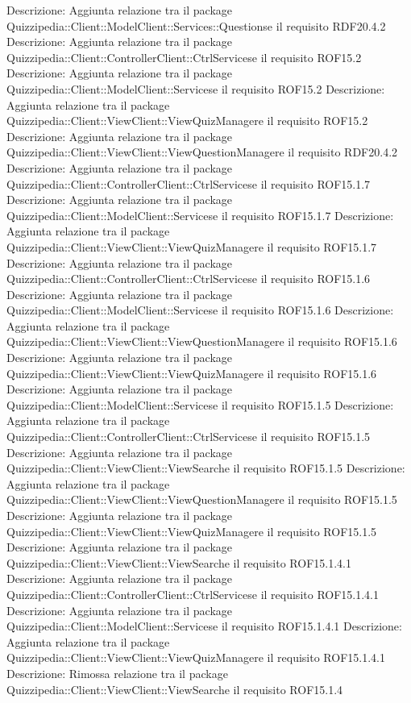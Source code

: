 Descrizione: Aggiunta relazione tra il package Quizzipedia::Client::ModelClient::Services::Questionse il requisito RDF20.4.2 
Descrizione: Aggiunta relazione tra il package Quizzipedia::Client::ControllerClient::CtrlServicese il requisito ROF15.2 
Descrizione: Aggiunta relazione tra il package Quizzipedia::Client::ModelClient::Servicese il requisito ROF15.2 
Descrizione: Aggiunta relazione tra il package Quizzipedia::Client::ViewClient::ViewQuizManagere il requisito ROF15.2 
Descrizione: Aggiunta relazione tra il package Quizzipedia::Client::ViewClient::ViewQuestionManagere il requisito RDF20.4.2 
Descrizione: Aggiunta relazione tra il package Quizzipedia::Client::ControllerClient::CtrlServicese il requisito ROF15.1.7 
Descrizione: Aggiunta relazione tra il package Quizzipedia::Client::ModelClient::Servicese il requisito ROF15.1.7 
Descrizione: Aggiunta relazione tra il package Quizzipedia::Client::ViewClient::ViewQuizManagere il requisito ROF15.1.7 
Descrizione: Aggiunta relazione tra il package Quizzipedia::Client::ControllerClient::CtrlServicese il requisito ROF15.1.6 
Descrizione: Aggiunta relazione tra il package Quizzipedia::Client::ModelClient::Servicese il requisito ROF15.1.6 
Descrizione: Aggiunta relazione tra il package Quizzipedia::Client::ViewClient::ViewQuestionManagere il requisito ROF15.1.6 
Descrizione: Aggiunta relazione tra il package Quizzipedia::Client::ViewClient::ViewQuizManagere il requisito ROF15.1.6 
Descrizione: Aggiunta relazione tra il package Quizzipedia::Client::ModelClient::Servicese il requisito ROF15.1.5 
Descrizione: Aggiunta relazione tra il package Quizzipedia::Client::ControllerClient::CtrlServicese il requisito ROF15.1.5 
Descrizione: Aggiunta relazione tra il package Quizzipedia::Client::ViewClient::ViewSearche il requisito ROF15.1.5 
Descrizione: Aggiunta relazione tra il package Quizzipedia::Client::ViewClient::ViewQuestionManagere il requisito ROF15.1.5 
Descrizione: Aggiunta relazione tra il package Quizzipedia::Client::ViewClient::ViewQuizManagere il requisito ROF15.1.5 
Descrizione: Aggiunta relazione tra il package Quizzipedia::Client::ViewClient::ViewSearche il requisito ROF15.1.4.1 
Descrizione: Aggiunta relazione tra il package Quizzipedia::Client::ControllerClient::CtrlServicese il requisito ROF15.1.4.1 
Descrizione: Aggiunta relazione tra il package Quizzipedia::Client::ModelClient::Servicese il requisito ROF15.1.4.1 
Descrizione: Aggiunta relazione tra il package Quizzipedia::Client::ViewClient::ViewQuizManagere il requisito ROF15.1.4.1 
Descrizione: Rimossa relazione tra il package Quizzipedia::Client::ViewClient::ViewSearche il requisito ROF15.1.4 
